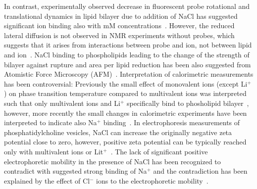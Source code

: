 \documentclass[pre,aps,floatfix,authordate1-4,twocolumn]{revtex4-1}
\begin{document}

In contrast, experimentally observed decrease in fluorescent probe rotational and translational dynamics
in lipid bilayer due to addition of NaCl has suggested significant ion binding also with mM 
concentrations~\cite{bockmann03,vacha09a,harb13}. However, the reduced lateral diffusion is not observed
in NMR experiments without probes, which suggests that it arises from interactions between probe and ion,
not between lipid and ion~\cite{filippov09}. NaCl binding to phospholipids leading to the change of the strength of 
bilayer against rupture and area per lipid reduction has been also suggested from Atomistic Force Microscopy (AFM)~\cite{manyes05,manyes06,fukuma07,ferber11,morata12}.
Interpretation of calorimetric measurements has been controversial: Previously the small effect of
monovalent ions (except Li$^+$)  on phase transition temperature compared to multivalent ions was interpreted such that 
only multivalent ions and Li$^+$ specifically bind to phosholipid bilayer~\cite{cevc90}, however, more recently the
small changes in calorimetric experiments have been interpreted to indicate also Na$^+$ binding~\cite{bockmann03,klasczyk10}.
In electrophoresis measurements of phosphatidylcholine vesicles, NaCl can increase the originally negative zeta potential 
close to zero, however, positive zeta potential can be typically reached only with multivalent ions or Lit$^+$~\cite{eisenberg79,tatulian87,manyes05,manyes06,klasczyk10}. The lack of significant positive electrophoretic mobility in the presence
of NaCl has been recognized to contradict with suggested strong binding of Na$^+$ and the contradiction
has been explained by the effect of Cl$^-$ ions to the electrophoretic mobility~\cite{berkowitz06,knecht13}.
 
\end{document}
